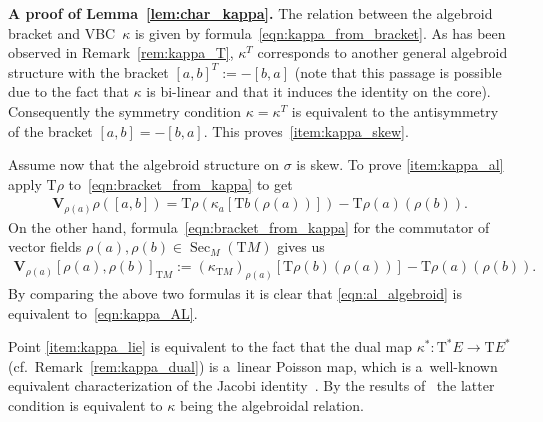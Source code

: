 \documentclass[pdftex]{sigma}
\newcommand{\ZM}{{VBC}} %
\newcommand{\Sec}{\operatorname{Sec}}
\newcommand{\V}{\mathbf{V}} %
\newcommand{\ra}{\rightarrow}
\newcommand{\T}{\mathrm{T}} %
\numberwithin{equation}{section}
\theoremstyle{definition}
\begin{document}
{\bf A proof of Lemma~\ref{lem:char_kappa}.} %
The relation between the algebroid bracket and \ZM\ $\kappa$ is given by formula~\eqref{eqn:kappa_from_bracket}. As has been observed in Remark~\ref{rem:kappa_T}, $\kappa^T$ corresponds to another general algebroid structure with the bracket $[a,b]^T:=-[b,a]$ (note that this passage is possible due to the fact that $\kappa$ is bi-linear and that it induces the identity on the core). Consequently the symmetry condition $\kappa=\kappa^T$ is equivalent to the antisymmetry of the bracket $[a,b]=-[b,a]$. This proves~\eqref{item:kappa_skew}.

Assume now that the algebroid structure on $\sigma$ is skew. To prove \eqref{item:kappa_al} apply $\T\rho$ to~\eqref{eqn:bracket_from_kappa} to get
\begin{gather*}\V_{\rho(a)}\rho([a,b])=\T\rho (\kappa_a [\T b(\rho(a)) ] )-\T \rho(a)(\rho(b)).\end{gather*}
On the other hand, formula~\eqref{eqn:bracket_from_kappa} for the commutator of vector fields $\rho(a),\rho(b)\in \Sec_M(\T M)$ gives us
\begin{gather*}\V_{\rho(a)}[\rho(a),\rho(b)]_{\T M}:=(\kappa_{\T M})_{\rho(a)} [\T\rho(b)(\rho(a)) ]-\T \rho(a)(\rho(b)).\end{gather*}
By comparing the above two formulas it is clear that \eqref{eqn:al_algebroid} is equivalent to~\eqref{eqn:kappa_AL}.

 Point \eqref{item:kappa_lie} is equivalent to the fact that the dual map $\kappa^\ast\colon \T^\ast E\ra \T E^\ast$ (cf.\ Remark~\ref{rem:kappa_dual}) is a~linear Poisson map, which is a~well-known equivalent characterization of the Jacobi identity~\cite{JG_PU_Algebroids_1999}. By the results of~\cite{JG_mod_class_skew_alg_rel_2012} the latter condition is equivalent to $\kappa$ being the algebroidal relation. %
\end{document}

